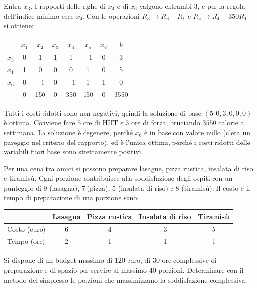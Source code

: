 Entra $x_3$. I rapporti delle righe di $x_4$ e di $x_6$ valgono entrambi $3$, e per la regola dell'indice minimo esce $x_4$. Con le operazioni $R_3 \to R_3 - R_1$ e $R_4 \to R_4 + 350R_1$ si ottiene:
\begin{center}
\begin{tabular}{c|cccccc|c}
 & $x_1$ & $x_2$ & $x_3$ & $x_4$ & $x_5$ & $x_6$ & $b$ \\
\hline
$x_3$ & 0 & 1 & 1 & 1 & $-1$ & 0 & 3 \\
$x_1$ & 1 & 0 & 0 & 0 & 1 & 0 & 5 \\
$x_6$ & 0 & $-1$ & 0 & $-1$ & 1 & 1 & 0 \\
\hline
 & 0 & 150 & 0 & 350 & 150 & 0 & 3550 \\
\end{tabular}
\end{center}
Tutti i costi ridotti sono non negativi, quindi la soluzione di base $(5, 0, 3, 0, 0, 0)$ è ottima. Conviene fare $5$ ore di HIIT e $3$ ore di forza, bruciando $3550$ calorie a settimana. La soluzione è degenere, perché $x_6$ è in base con valore nullo (c'era un pareggio nel criterio del rapporto), ed è l'unica ottima, perché i costi ridotti delle variabili fuori base sono strettamente positivi.

\begin{esercizio}
Per una cena tra amici si possono preparare lasagne, pizza rustica, insalata di riso e tiramisù. Ogni porzione contribuisce alla soddisfazione degli ospiti con un punteggio di $9$ (lasagna), $7$ (pizza), $5$ (insalata di riso) e $8$ (tiramisù). Il costo e il tempo di preparazione di una porzione sono:
\begin{center}
\begin{tabular}{lcccc}
\toprule
 & Lasagna & Pizza rustica & Insalata di riso & Tiramisù \\
\midrule
Costo (euro) & 6 & 4 & 3 & 5 \\
Tempo (ore) & 2 & 1 & 1 & 1 \\
\bottomrule
\end{tabular}
\end{center}
Si dispone di un budget massimo di $120$ euro, di $30$ ore complessive di preparazione e di spazio per servire al massimo $40$ porzioni. Determinare con il metodo del simplesso le porzioni che massimizzano la soddisfazione complessiva.
\end{esercizio}

